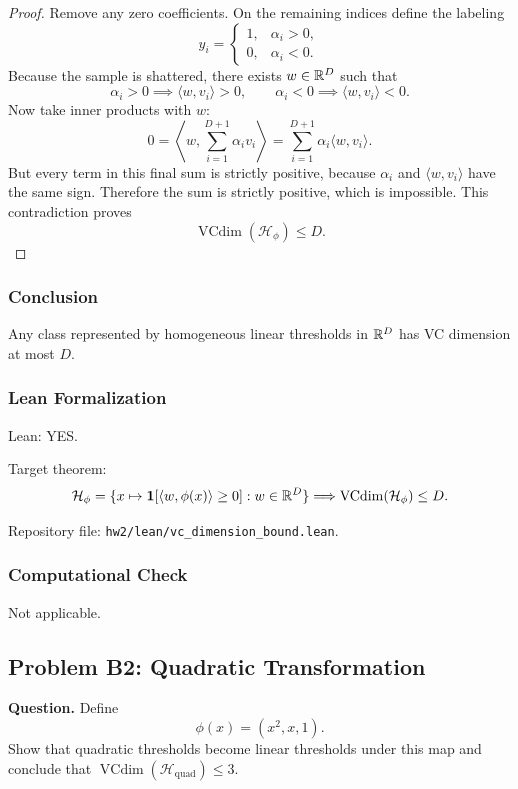 \documentclass{article}
\newcommand{\vcdim}{\operatorname{VCdim}}
\newcommand{\classB}{\mathcal{H}_{\mathrm{quad}}}
\begin{document}
\begin{solutionbox}
\begin{proof}
Remove any zero coefficients. On the remaining indices define the labeling
\[
y_i=
\begin{cases}
1, & \alpha_i>0,\\
0, & \alpha_i<0.
\end{cases}
\]
Because the sample is shattered, there exists \(w\in\mathbb{R}^D\) such that
\[
\alpha_i>0 \implies \langle w,v_i\rangle >0,
\qquad
\alpha_i<0 \implies \langle w,v_i\rangle <0.
\]
Now take inner products with \(w\):
\[
0
=
\left\langle
w,\sum_{i=1}^{D+1}\alpha_i v_i
\right\rangle
=
\sum_{i=1}^{D+1}\alpha_i\langle w,v_i\rangle.
\]
But every term in this final sum is strictly positive, because \(\alpha_i\) and
\(\langle w,v_i\rangle\) have the same sign. Therefore the sum is strictly
positive, which is impossible. This contradiction proves
\[
\vcdim(\mathcal{H}_{\phi})\le D.
\]
\end{proof}

\subsubsection{Conclusion}

Any class represented by homogeneous linear thresholds in \(\mathbb{R}^D\) has VC
dimension at most \(D\).

\subsubsection{Lean Formalization}

Lean: YES.

Target theorem:
\[
\mathcal{H}_{\phi}
=
\{x\mapsto \mathbf{1}[\langle w,\phi(x)\rangle\ge 0] : w\in\R^D\}
\Longrightarrow
\vcdim(\mathcal{H}_{\phi})\le D.
\]

Repository file:
\texttt{hw2/lean/vc\_dimension\_bound.lean}.

\subsubsection{Computational Check}

Not applicable.

\end{solutionbox}

\subsection{Problem B2: Quadratic Transformation}

\textbf{Question.}
\newline
Define
\[
\phi(x)=(x^2,x,1).
\]
Show that quadratic thresholds become linear thresholds under this map and
conclude that \(\vcdim(\classB)\le 3\).
\end{document}
